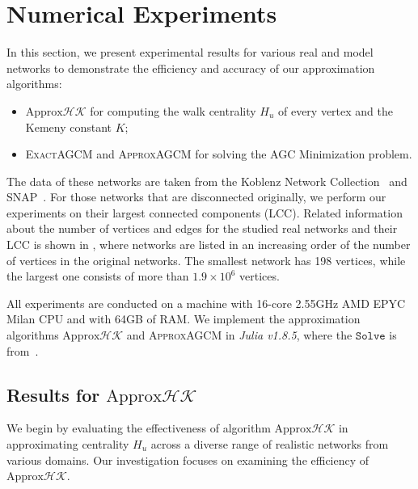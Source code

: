 \documentclass[10pt,journal,compsoc,twocolumn,twoside]{IEEEtran}
\begin{document}
\section{Numerical Experiments}

In this section, we present experimental results for various real and model networks to demonstrate the  efficiency and accuracy of our approximation algorithms:
\begin{itemize}
    \item \(\text{Approx}\mathcal{HK}\) for computing the walk centrality \(H_u\) of  every vertex and the Kemeny constant \(K\);
    \item \textsc{ExactAGCM} and \textsc{ApproxAGCM} for solving the AGC Minimization problem.
\end{itemize}

The data of these networks are taken from the Koblenz Network Collection~\cite{Ku13} and SNAP~\cite{LeKr14}. For those networks that are disconnected originally, we perform our experiments on their largest connected components (LCC). Related information about the number of vertices and edges for the studied real networks and their LCC is shown  in ,  where networks are listed in an increasing order of the number of vertices in the original networks. The smallest network has 198 vertices, while the largest one consists of more than \(1.9 \times 10^{6}\) vertices.

All experiments are conducted on a machine with 16-core 2.55GHz AMD EPYC Milan CPU and with 64GB of RAM. We implement the approximation algorithms \(\text{Approx}\mathcal{HK}\) and \textsc{ApproxAGCM} in \textit{Julia v1.8.5}, where the \(\mathtt{Solve}\) is from~\cite{GaKySp23}. %

\subsection{Results for \(\text{Approx}\mathcal{HK}\)}

We begin by evaluating the effectiveness of algorithm \(\text{Approx}\mathcal{HK}\) in approximating centrality \(H_u\) across a diverse range of realistic networks from various domains. Our investigation focuses on examining the efficiency of \(\text{Approx}\mathcal{HK}\).
\end{document}
